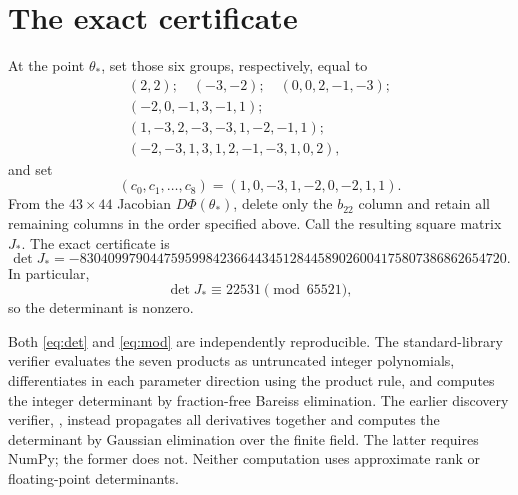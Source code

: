 \documentclass[11pt]{article}
\begin{document}
\section{The exact certificate}
At the point $\theta_*$, set those six groups, respectively, equal to
\[
\begin{gathered}
(2,2);\quad(-3,-2);\quad(0,0,2,-1,-3);\\
(-2,0,-1,3,-1,1);\\
(1,-3,2,-3,-3,1,-2,-1,1);\\
(-2,-3,1,3,1,2,-1,-3,1,0,2),
\end{gathered}
\]
and set
\[
(c_0,c_1,\ldots,c_8)=(1,0,-3,1,-2,0,-2,1,1).
\]
From the $43\times44$ Jacobian $D\Phi(\theta_*)$, delete only the $b_{22}$ column and retain all remaining columns in the order specified above. Call the resulting square matrix $J_*$. The exact certificate is
\begin{equation}\label{eq:det}
\det J_*=-8304099790447595998423664434512844589026004175807386862654720.
\end{equation}
In particular,
\begin{equation}\label{eq:mod}
\det J_*\equiv22531\pmod{65521},
\end{equation}
so the determinant is nonzero.

Both \eqref{eq:det} and \eqref{eq:mod} are independently reproducible. The standard-library verifier  evaluates the seven products as untruncated integer polynomials, differentiates in each parameter direction using the product rule, and computes the integer determinant by fraction-free Bareiss elimination. The earlier discovery verifier, , instead propagates all derivatives together and computes the determinant by Gaussian elimination over the finite field. The latter requires NumPy; the former does not. Neither computation uses approximate rank or floating-point determinants.
\end{document}

